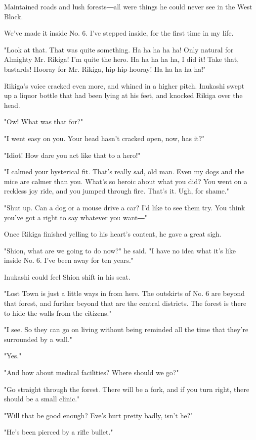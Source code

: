 Maintained roads and lush forests―all were things he could never see in
the West Block.

We've made it inside No. 6. I've stepped inside, for the first time in
my life.

"Look at that. That was quite something. Ha ha ha ha ha! Only natural
for Almighty Mr. Rikiga! I'm quite the hero. Ha ha ha ha ha, I did it!
Take that, bastards! Hooray for Mr. Rikiga, hip-hip-hooray! Ha ha ha ha
ha!"

Rikiga's voice cracked even more, and whined in a higher pitch. Inukashi
swept up a liquor bottle that had been lying at his feet, and knocked
Rikiga over the head.

"Ow! What was that for?"

"I went easy on you. Your head hasn't cracked open, now, has it?"

"Idiot! How dare you act like that to a hero!"

"I calmed your hysterical fit. That's really sad, old man. Even my dogs
and the mice are calmer than you. What's so heroic about what you did?
You went on a reckless joy ride, and you jumped through fire. That's it.
Ugh, for shame."

"Shut up. Can a dog or a mouse drive a car? I'd like to see them try.
You think you've got a right to say whatever you want―"

Once Rikiga finished yelling to his heart's content, he gave a great
sigh.

"Shion, what are we going to do now?" he said. "I have no idea what it's
like inside No. 6. I've been away for ten years."

Inukashi could feel Shion shift in his seat.

"Lost Town is just a little ways in from here. The outskirts of No. 6
are beyond that forest, and further beyond that are the central
districts. The forest is there to hide the walls from the citizens."

"I see. So they can go on living without being reminded all the time
that they're surrounded by a wall."

"Yes."

"And how about medical facilities? Where should we go?"

"Go straight through the forest. There will be a fork, and if you turn
right, there should be a small clinic."

"Will that be good enough? Eve's hurt pretty badly, isn't he?"

"He's been pierced by a rifle bullet."

